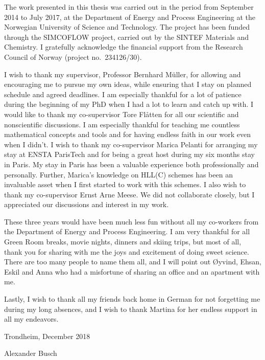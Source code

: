 
The work presented in this thesis was carried out in the period from September 2014 to July 2017, at the Department of Energy and Process Engineering at the Norwegian University of Science and Technology. The project has been funded through the SIMCOFLOW project, carried out by the SINTEF Materials and Chemistry. I gratefully acknowledge the financial support from the Research Council of Norway (project no.~234126/30). 

I wish to thank my supervisor, Professor Bernhard M\"{u}ller, for allowing and encouraging me to pursue my own ideas, while ensuring that I stay on planned schedule and agreed deadlines. I am especially thankful for a lot of patience during the beginning of my PhD when I had a lot to learn and catch up with. I would like to thank my co-supervisor Tore Fl{\aa}tten for all our scientific and nonscientific discussions. I am especially thankful for teaching me countless mathematical concepts and tools and for having endless faith in our work even when I didn't. I wish to thank my co-supervisor Marica Pelanti for arranging my stay at ENSTA ParisTech and for being a great host during my six months stay in Paris. My stay in Paris has been a valuable experience both professionally and personally. Further, Marica's knowledge on HLL(C) schemes has been an invaluable asset when I first started to work with this schemes. I also wish to thank my co-supervisor Ernst Arne Meese. We did not collaborate closely, but I appreciated our discussions and interest in my work.

These three years would have been much less fun without all my co-workers from the Department of Energy and Process Engineering. I am very thankful for all Green Room breaks, movie nights, dinners and skiing trips, but most of all, thank you for sharing with me the joys and excitement of doing sweet science. There are too many people to name them all, and I will point out {\O}yvind, Ehsan, Eskil and Anna who had a misfortune of sharing an office and an apartment with me. 

Lastly, I wish to thank all my friends back home in German for not forgetting me during my long absences, and I wish to thank Martina for her endless support in all my endeavors. 

\vspace*{2\baselineskip}

\hfill Trondheim, December 2018

\hfill Alexander Busch
